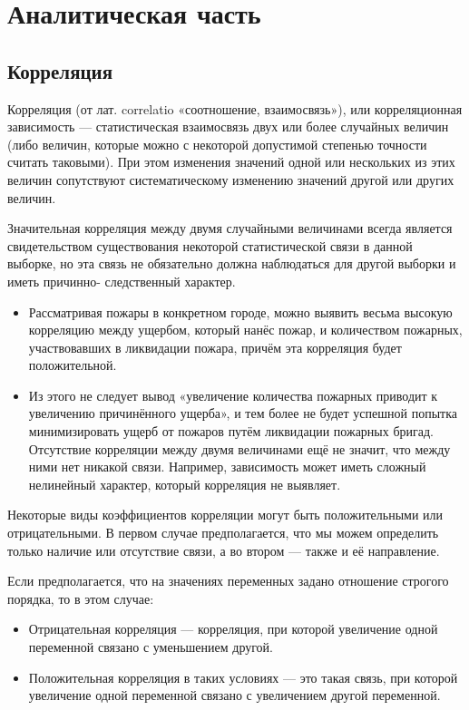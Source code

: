 \chapter{Аналитическая часть}



\section{Корреляция}

Корреляция (от лат. correlatio «соотношение, взаимосвязь»), или
корреляционная зависимость — статистическая взаимосвязь двух или
более случайных величин (либо величин, которые можно с некоторой
допустимой степенью точности считать таковыми). При этом изменения
значений одной или нескольких из этих величин сопутствуют
систематическому изменению значений другой или других величин.

Значительная корреляция между двумя случайными величинами
всегда является свидетельством существования некоторой
статистической связи в данной выборке, но эта связь не обязательно
должна наблюдаться для другой выборки и иметь причинно-
следственный характер.
\begin{itemize}[label*=---]
\item Рассматривая пожары в конкретном городе, можно выявить весьма
высокую корреляцию между ущербом, который нанёс пожар, и
количеством пожарных, участвовавших в ликвидации пожара,
причём эта корреляция будет положительной.
\item Из этого не следует вывод «увеличение количества пожарных
приводит к увеличению причинённого ущерба», и тем более не будет
успешной попытка минимизировать ущерб от пожаров путём
ликвидации пожарных бригад.
Отсутствие корреляции между двумя величинами ещё не значит,
что между ними нет никакой связи. Например, зависимость может
иметь сложный нелинейный характер, который корреляция не
выявляет.
\end{itemize}

Некоторые виды коэффициентов корреляции могут быть
положительными или отрицательными. В первом случае предполагается, что мы можем определить
только наличие или отсутствие связи, а во втором — также и её
направление.

Если предполагается, что на значениях переменных задано
отношение строгого порядка, то в этом случае:
\begin{itemize}[label*=---]
	\item Отрицательная корреляция — корреляция, при которой
	увеличение одной переменной связано с уменьшением другой.
	\item Положительная корреляция в таких условиях — это такая связь,
	при которой увеличение одной переменной связано с
	увеличением другой переменной.
\end{itemize}

